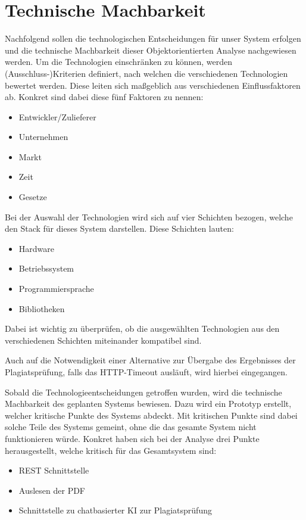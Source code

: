 \chapter{Technische Machbarkeit}\label{ch:technische-machbarkeit}
Nachfolgend sollen die technologischen Entscheidungen für unser System erfolgen
und die technische Machbarkeit dieser Objektorientierten Analyse nachgewiesen werden.
Um die Technologien einschränken zu können, werden (Ausschluss-)Kriterien definiert,
nach welchen die verschiedenen Technologien bewertet werden.
Diese leiten sich maßgeblich aus verschiedenen Einflussfaktoren ab.
Konkret sind dabei diese fünf Faktoren zu nennen:

\begin{itemize}
    \item Entwickler/Zulieferer
    \item Unternehmen
    \item Markt
    \item Zeit
    \item Gesetze
\end{itemize}

Bei der Auswahl der Technologien wird sich auf vier Schichten bezogen,
welche den Stack für dieses System darstellen.
Diese Schichten lauten:
\begin{itemize}
    \item Hardware
    \item Betriebssystem
    \item Programmiersprache
    \item Bibliotheken
\end{itemize}
Dabei ist wichtig zu überprüfen, ob die ausgewählten Technologien
aus den verschiedenen Schichten miteinander kompatibel sind.

Auch auf die Notwendigkeit einer Alternative zur Übergabe des Ergebnisses der Plagiatsprüfung,
falls das HTTP-Timeout ausläuft, wird hierbei eingegangen.

Sobald die Technologieentscheidungen getroffen wurden,
wird die technische Machbarkeit des geplanten Systems bewiesen.
Dazu wird ein Prototyp erstellt, welcher kritische Punkte des Systems abdeckt.
Mit kritischen Punkte sind dabei solche Teile des Systems gemeint,
ohne die das gesamte System nicht funktionieren würde.
Konkret haben sich bei der Analyse drei Punkte herausgestellt,
welche kritisch für das Gesamtsystem sind:
\begin{itemize}
    \item REST Schnittstelle
    \item Auslesen der PDF
    \item Schnittstelle zu chatbasierter KI zur Plagiatsprüfung
\end{itemize}


